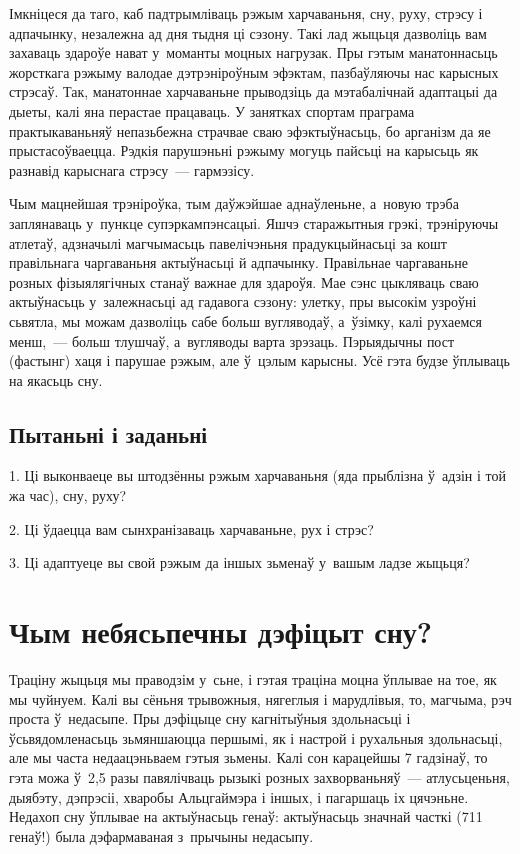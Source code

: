 Імкніцеся да таго, каб падтрымліваць рэжым харчаваньня, сну, руху, стрэсу і адпачынку, незалежна ад дня тыдня ці сэзону. Такі лад жыцьця дазволіць вам захаваць здароўе нават у~моманты моцных нагрузак. Пры гэтым манатоннасьць жорсткага рэжыму валодае дэтрэніроўным эфэктам, пазбаўляючы нас карысных стрэсаў. Так, манатоннае харчаваньне прыводзіць да мэтабалічнай адаптацыі да дыеты, калі яна перастае працаваць. У занятках спортам праграма практыкаваньняў непазьбежна страчвае сваю эфэктыўнасьць, бо арганізм да яе прыстасоўваецца. Рэдкія парушэньні рэжыму могуць пайсьці на карысьць як разнавід карыснага стрэсу~--- гармэзісу.

Чым мацнейшая трэніроўка, тым даўжэйшае аднаўленьне, а~новую трэба заплянаваць у~пункце супэркампэнсацыі. Яшчэ старажытныя грэкі, трэніруючы атлетаў, адзначылі магчымасьць павелічэньня прадукцыйнасьці за кошт правільнага чаргаваньня актыўнасьці й адпачынку. Правільнае чаргаваньне розных фізыялягічных станаў важнае для здароўя. Мае сэнс цыкляваць сваю актыўнасьць у~залежнасьці ад гадавога сэзону: улетку, пры высокім узроўні сьвятла, мы можам дазволіць сабе больш вугляводаў, а~ўзімку, калі рухаемся менш,~--- больш тлушчаў, а~вугляводы варта зрэзаць. Пэрыядычны пост (фастынг) хаця і парушае рэжым, але ў~цэлым карысны. Усё гэта будзе ўплываць на якасьць сну.

\subsection*{Пытаньні і заданьні}

1. Ці выконваеце вы штодзённы рэжым харчаваньня (яда прыблізна ў~адзін і той жа час), сну, руху?

2. Ці ўдаецца вам сынхранізаваць харчаваньне, рух і стрэс?

3. Ці адаптуеце вы свой рэжым да іншых зьменаў у~вашым ладзе жыцьця?


\section{Чым небясьпечны дэфіцыт сну?}

Траціну жыцьця мы праводзім у~сьне, і гэтая траціна моцна ўплывае на тое, як мы чуйнуем. Калі вы сёньня трывожныя, нягеглыя і марудлівыя, то, магчыма, рэч проста ў~недасыпе. Пры дэфіцыце сну кагнітыўныя здольнасьці і ўсьвядомленасьць зьмяншаюцца першымі, як і настрой і рухальныя здольнасьці, але мы часта недаацэньваем гэтыя зьмены. Калі сон карацейшы 7 гадзінаў, то гэта можа ў~2,5 разы павялічваць рызыкі розных захворваньняў~--- атлусьценьня, дыябэту, дэпрэсіі, хваробы Альцгаймэра і іншых, і пагаршаць іх цячэньне. Недахоп сну ўплывае на актыўнасьць генаў: актыўнасьць значнай часткі (711 генаў!) была дэфармаваная з~прычыны недасыпу.

